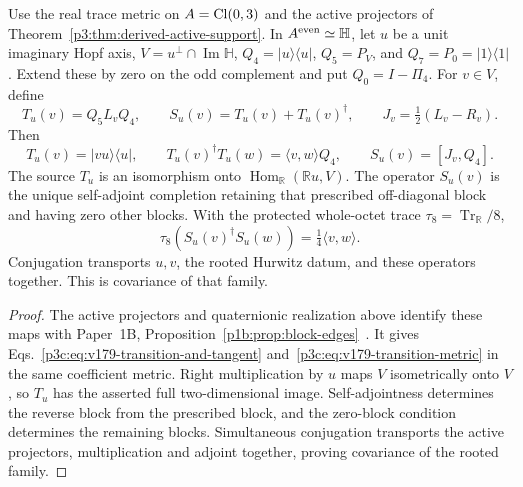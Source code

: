 \documentclass[12pt,a4paper]{article}
\begin{document}
\begin{theorem}
\label{p3c:thm:v179-clifford-projector-tangent}
Use the real trace metric on \(A=\operatorname{Cl}(0,3)\) and the active projectors of
Theorem~\ref{p3:thm:derived-active-support}.  In
\(A^{\rm even}\simeq\mathbb H\), let \(u\) be a unit imaginary Hopf axis,
\(V=u^\perp\cap\operatorname{Im}\mathbb H\),
\(Q_4=|u\rangle\langle u|\), \(Q_5=P_V\), and
\(Q_7=P_0=|1\rangle\langle1|\).  Extend these by zero on the odd complement
and put \(Q_0=I-\Pi_4\).  For \(v\in V\), define
\[
 T_u(v)=Q_5L_vQ_4,\qquad S_u(v)=T_u(v)+T_u(v)^\dagger,
 \qquad J_v=\tfrac12(L_v-R_v).
\]
Then
\begin{equation}
\label{p3c:eq:v179-transition-and-tangent}
 T_u(v)=|vu\rangle\langle u|,\qquad
 T_u(v)^\dagger T_u(w)=\langle v,w\rangle Q_4,\qquad
 S_u(v)=[J_v,Q_4].
\end{equation}
The source \(T_u\) is an isomorphism onto
\(\operatorname{Hom}_{\mathbb R}(\mathbb Ru,V)\).  The operator \(S_u(v)\)
is the unique self-adjoint completion retaining that prescribed off-diagonal
block and having zero other blocks.  With the protected whole-octet trace
\(\tau_8=\operatorname{Tr}_{\mathbb R}/8\),
\begin{equation}
\label{p3c:eq:v179-transition-metric}
 \tau_8(S_u(v)^\dagger S_u(w))=\tfrac14\langle v,w\rangle .
\end{equation}
Conjugation transports \(u,v\), the rooted Hurwitz datum, and these operators
together.  This is covariance of that family.
\end{theorem}
\begin{proof}
The active projectors and quaternionic realization above identify these
maps with Paper~1B, Proposition~\ref{p1b:prop:block-edges}~\cite{Kugelmann2026Paper1B}.
It gives Eqs.~\eqref{p3c:eq:v179-transition-and-tangent}
and~\eqref{p3c:eq:v179-transition-metric} in the same coefficient metric.
Right multiplication by \(u\) maps \(V\) isometrically onto \(V\), so
\(T_u\) has the asserted full two-dimensional image.  Self-adjointness
determines the reverse block from the prescribed block, and the zero-block
condition determines the remaining blocks.  Simultaneous conjugation
transports the active projectors, multiplication and adjoint together,
proving covariance of the rooted family.
\end{proof}
\end{document}
